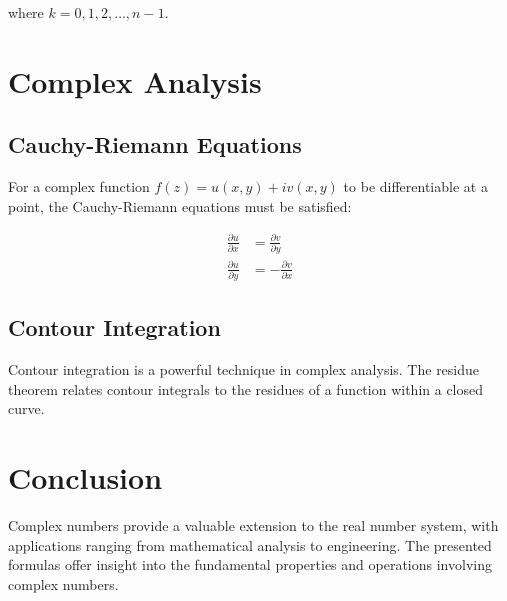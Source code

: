 \documentclass{article}
\begin{document}
where $k = 0, 1, 2, \ldots, n-1$.

\section{Complex Analysis}

\subsection{Cauchy-Riemann Equations}

For a complex function $f(z) = u(x, y) + iv(x, y)$ to be differentiable at a point, the Cauchy-Riemann equations must be satisfied:

\begin{align}
    \frac{\partial u}{\partial x} &= \frac{\partial v}{\partial y} \\
    \frac{\partial u}{\partial y} &= -\frac{\partial v}{\partial x}
\end{align}

\subsection{Contour Integration}

Contour integration is a powerful technique in complex analysis. The residue theorem relates contour integrals to the residues of a function within a closed curve.

\section{Conclusion}

Complex numbers provide a valuable extension to the real number system, with applications ranging from mathematical analysis to engineering. The presented formulas offer insight into the fundamental properties and operations involving complex numbers.
\end{document}
